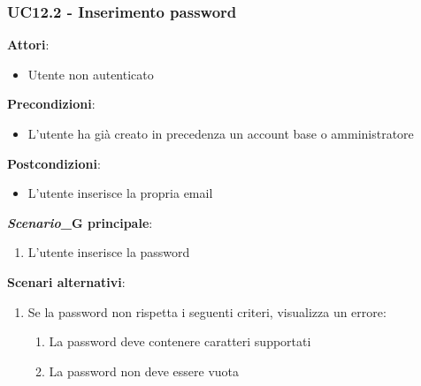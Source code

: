 \subsubsection{UC12.2 - Inserimento password} \label{usecase:12_2}
\textbf{Attori}:
\begin{itemize}
    \item Utente non autenticato
\end{itemize}
\textbf{Precondizioni}:
\begin{itemize}
    \item L'utente ha già creato in precedenza un account base o amministratore
\end{itemize}
\textbf{Postcondizioni}:
\begin{itemize}
    \item L'utente inserisce la propria email
\end{itemize}
\textbf{\textit{Scenario}_G principale}:
\begin{enumerate}
    \item L'utente inserisce la password
\end{enumerate}
\textbf{Scenari alternativi}:
\begin{enumerate}
    \item Se la password non rispetta i seguenti criteri, visualizza un errore:
    \begin{enumerate}
        \item La password deve contenere caratteri supportati
        \item La password non deve essere vuota
    \end{enumerate}
\end{enumerate}